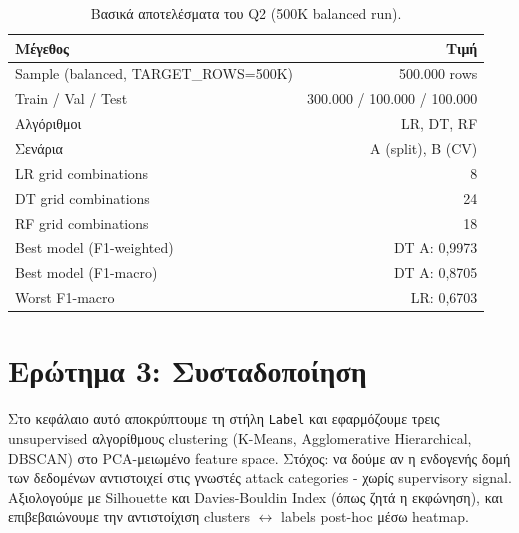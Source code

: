 \documentclass[12pt,a4paper,twoside]{book}
\begin{document}
\begin{table}[H]
    \centering
    \begin{tabular}{lr}
        \toprule
        \textbf{Μέγεθος}                                     & \textbf{Τιμή} \\
        \midrule
        Sample (balanced, TARGET\_ROWS=500K)                 & 500.000 rows  \\
        Train / Val / Test                                   & 300.000 / 100.000 / 100.000 \\
        Αλγόριθμοι                                           & LR, DT, RF    \\
        Σενάρια                                              & A (split), B (CV) \\
        LR grid combinations                                 & 8             \\
        DT grid combinations                                 & 24            \\
        RF grid combinations                                 & 18            \\
        Best model (F1-weighted)                             & DT A: 0,9973  \\
        Best model (F1-macro)                                & DT A: 0,8705  \\
        Worst F1-macro                                       & LR: 0,6703    \\
        \bottomrule
    \end{tabular}
    \caption{Βασικά αποτελέσματα του Q2 (500K balanced run).}\label{tab:q2_summary}
\end{table}

\chapter{Ερώτημα 3: Συσταδοποίηση}\label{ch:q3}

Στο κεφάλαιο αυτό αποκρύπτουμε τη στήλη \texttt{Label} και εφαρμόζουμε
τρεις unsupervised αλγορίθμους clustering (K-Means, Agglomerative
Hierarchical, DBSCAN) στο PCA-μειωμένο feature space. Στόχος: να δούμε
αν η ενδογενής δομή των δεδομένων αντιστοιχεί στις γνωστές attack
categories - χωρίς supervisory signal. Αξιολογούμε με Silhouette και
Davies-Bouldin Index (όπως ζητά η εκφώνηση), και επιβεβαιώνουμε την
αντιστοίχιση clusters \(\leftrightarrow\) labels post-hoc μέσω heatmap.
\end{document}
